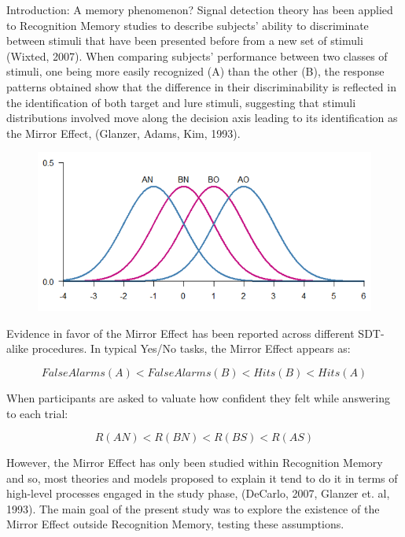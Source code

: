 \documentclass[final]{beamer}
\newlength{\onecolwid}
\begin{document}
\begin{frame}[t]
\begin{columns}[t]
\begin{column}{\onecolwid}
\begin{alertblock}{Introduction: A memory phenomenon?}
Signal detection theory has been applied to Recognition Memory studies to describe subjects’ ability to discriminate between stimuli that have been presented before from a new set of stimuli (Wixted, 2007). When comparing subjects' performance between two classes of stimuli, one being more easily recognized (A) than the other (B), the response patterns obtained show that the difference in their discriminability  is reflected in the identification of both target and lure stimuli, suggesting that stimuli distributions involved move along the decision axis leading to its identification as the Mirror Effect, (Glanzer, Adams, Kim, 1993). 
\begin{figure}
\includegraphics[width=0.5\linewidth]{Figures/MirrorEffect.png}
\end{figure}

Evidence in favor of the Mirror Effect has been reported across different SDT-alike procedures. In typical Yes/No tasks, the Mirror Effect appears as:

\begin{equation}
FalseAlarms(A) < FalseAlarms(B) < Hits(B) < Hits(A)
\label{eqn:Rates}
\end{equation}

When participants are asked to valuate how confident they felt while answering to each trial:

\begin{equation}
R(AN) < R(BN) < R(BS) < R(AS)
\label{eqn:Confidence}
\end{equation}

However, the Mirror Effect has only been studied within Recognition Memory and so, most theories and models proposed to explain it tend to do it in terms of high-level processes engaged in the study phase, (DeCarlo, 2007, Glanzer et. al, 1993). The main goal of the present study was to explore the existence of the Mirror Effect outside Recognition Memory, testing these assumptions. 
\end{alertblock}




\end{column}
\end{columns}
\end{frame}
\end{document}
